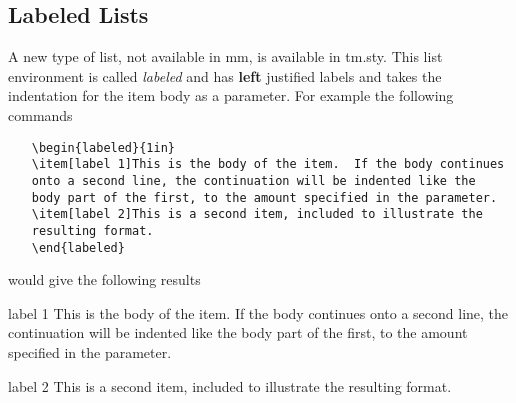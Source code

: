\subsection{Labeled Lists}
A new type of list, not available in mm, is available in tm.sty.  This
list environment is called {\it labeled} and has {\bf left} justified
labels and takes the indentation for the 
item body as a parameter.  For example the following commands
\begin{itemize}
\item[]
\verb|\begin{labeled}{1in}|\\
\verb|\item[label 1]This is the body of the item.  If the body continues|\\
\verb|onto a second line, the continuation will be indented like the|\\
\verb|body part of the first, to the amount specified in the parameter.|\\
\verb|\item[label 2]This is a second item, included to illustrate the|\\
\verb|resulting format.|\\
\verb|\end{labeled}|
\end{itemize}
would give the following results
\begin{labeled}{1in}
\item[label 1]This is the body of the item.  If the body continues
onto a second line, the continuation will be indented like the
body part of the first, to the amount specified in the parameter.
\item[label 2]This is a second item, included to illustrate the
resulting format.
\end{labeled}
